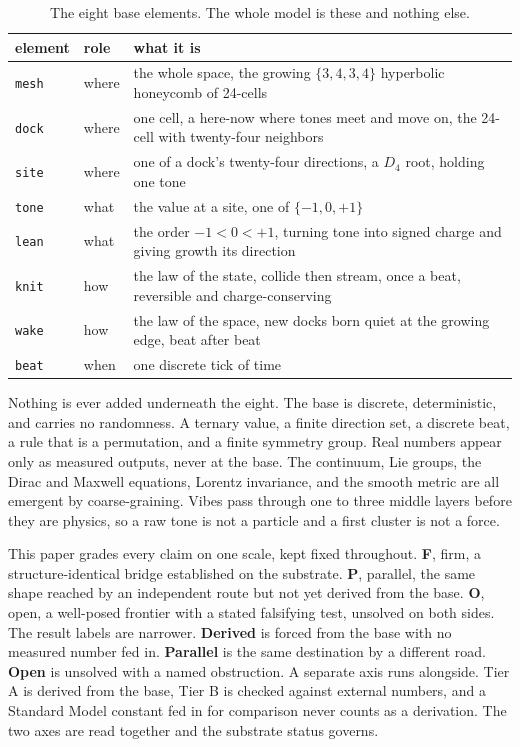 \begin{table}[ht]
\centering
\small
\begin{tabularx}{\textwidth}{@{}llX@{}}
\toprule
element & role & what it is \\
\midrule
\texttt{mesh} & where & the whole space, the growing $\{3,4,3,4\}$ hyperbolic honeycomb of 24-cells \\
\texttt{dock} & where & one cell, a here-now where tones meet and move on, the 24-cell with twenty-four neighbors \\
\texttt{site} & where & one of a dock's twenty-four directions, a $D_4$ root, holding one tone \\
\texttt{tone} & what & the value at a site, one of $\{-1, 0, +1\}$ \\
\texttt{lean} & what & the order $-1 < 0 < +1$, turning tone into signed charge and giving growth its direction \\
\texttt{knit} & how & the law of the state, collide then stream, once a beat, reversible and charge-conserving \\
\texttt{wake} & how & the law of the space, new docks born quiet at the growing edge, beat after beat \\
\texttt{beat} & when & one discrete tick of time \\
\bottomrule
\end{tabularx}
\caption{The eight base elements. The whole model is these and nothing else.}
\label{tab:elements}
\end{table}

Nothing is ever added underneath the eight. The base is discrete, deterministic, and carries no randomness. A ternary value, a finite direction set, a discrete beat, a rule that is a permutation, and a finite symmetry group. Real numbers appear only as measured outputs, never at the base. The continuum, Lie groups, the Dirac and Maxwell equations, Lorentz invariance, and the smooth metric are all emergent by coarse-graining. Vibes pass through one to three middle layers before they are physics, so a raw tone is not a particle and a first cluster is not a force.

This paper grades every claim on one scale, kept fixed throughout. \textbf{F}, firm, a structure-identical bridge established on the substrate. \textbf{P}, parallel, the same shape reached by an independent route but not yet derived from the base. \textbf{O}, open, a well-posed frontier with a stated falsifying test, unsolved on both sides. The result labels are narrower. \textbf{Derived} is forced from the base with no measured number fed in. \textbf{Parallel} is the same destination by a different road. \textbf{Open} is unsolved with a named obstruction. A separate axis runs alongside. Tier A is derived from the base, Tier B is checked against external numbers, and a Standard Model constant fed in for comparison never counts as a derivation. The two axes are read together and the substrate status governs.
